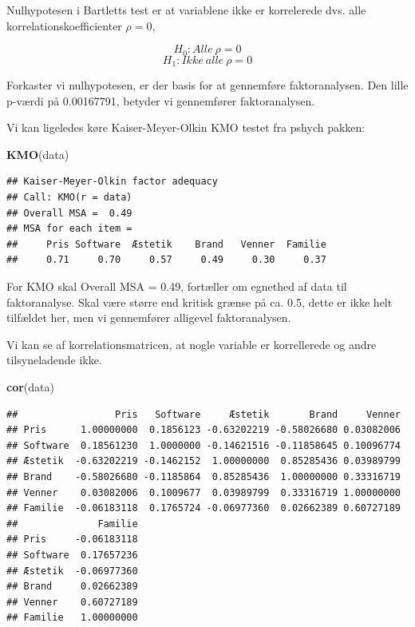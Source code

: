 \documentclass[]{book}
\newenvironment{Shaded}{\begin{snugshade}}{\end{snugshade}}
\newcommand{\KeywordTok}[1]{\textcolor[rgb]{0.13,0.29,0.53}{\textbf{#1}}}
\newcommand{\NormalTok}[1]{#1}
\begin{document}
Nulhypotesen i Bartletts test er at variablene ikke er korrelerede dvs. alle korrelationskoefficienter \(\rho=0\),

\[H_0:Alle\ \rho=0\]
\[H_1:Ikke\ alle\ \rho=0  \]

Forkaster vi nulhypotesen, er der basis for at gennemføre faktoranalysen. Den lille p-værdi på 0.00167791, betyder vi gennemfører faktoranalysen.

Vi kan ligeledes køre Kaiser-Meyer-Olkin KMO testet fra pshych pakken:

\begin{Shaded}
\begin{Highlighting}[]
\KeywordTok{KMO}\NormalTok{(data)}
\end{Highlighting}
\end{Shaded}

\begin{verbatim}
## Kaiser-Meyer-Olkin factor adequacy
## Call: KMO(r = data)
## Overall MSA =  0.49
## MSA for each item = 
##     Pris Software  Æstetik    Brand   Venner  Familie 
##     0.71     0.70     0.57     0.49     0.30     0.37
\end{verbatim}

For KMO skal Overall MSA = 0.49, fortæller om egnethed af data til faktoranalyse. Skal være større end kritisk grænse på ca. 0.5, dette er ikke helt tilfældet her, men vi gennemfører alligevel faktoranalysen.

Vi kan se af korrelationsmatricen, at nogle variable er korrellerede og andre tilsyneladende ikke.

\begin{Shaded}
\begin{Highlighting}[]
\KeywordTok{cor}\NormalTok{(data)}
\end{Highlighting}
\end{Shaded}

\begin{verbatim}
##                 Pris   Software     Æstetik       Brand     Venner
## Pris      1.00000000  0.1856123 -0.63202219 -0.58026680 0.03082006
## Software  0.18561230  1.0000000 -0.14621516 -0.11858645 0.10096774
## Æstetik  -0.63202219 -0.1462152  1.00000000  0.85285436 0.03989799
## Brand    -0.58026680 -0.1185864  0.85285436  1.00000000 0.33316719
## Venner    0.03082006  0.1009677  0.03989799  0.33316719 1.00000000
## Familie  -0.06183118  0.1765724 -0.06977360  0.02662389 0.60727189
##              Familie
## Pris     -0.06183118
## Software  0.17657236
## Æstetik  -0.06977360
## Brand     0.02662389
## Venner    0.60727189
## Familie   1.00000000
\end{verbatim}
\end{document}
